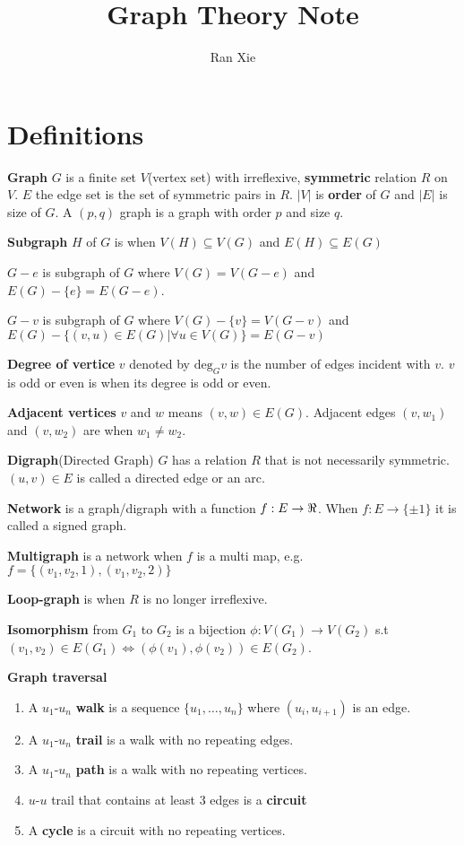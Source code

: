 \documentclass[12pt]{article}
\title{Graph Theory Note}
\author{Ran Xie}
\begin{document}
\maketitle
\section{Definitions}
\textbf{Graph} $G$ is a finite set $V$(vertex set) with irreflexive, \textbf{symmetric} relation $R$ on $V$. $E$ the edge set is the set of symmetric pairs in $R$.  $|V|$ is \textbf{order} of $G$ and $|E|$ is size of $G$. A $(p, q)$ graph is a graph with order $p$ and size $q$.

\textbf{Subgraph} $H$ of $G$ is when $V(H) \subseteq V(G)$ and $E(H) \subseteq  E(G)$

\textbf{$G - e$} is subgraph of $G$ where $V(G) = V(G -e)$ and $E(G) - \{e\} = E(G-e)$.

\textbf{$G - v$} is subgraph of $G$ where $V(G) - \{v\} = V(G - v)$ and $E(G) - \{(v, u) \in E(G) | \forall u \in V(G) \} = E(G - v)$

\textbf{Degree of vertice} $v$ denoted by $\text{deg}_G v$ is the number of edges incident with $v$. $v$ is odd or even is when its degree is odd or even.

\textbf{Adjacent vertices} $v$ and $w$ means $(v,w)\in E(G)$. Adjacent edges $(v, w_1)$ and $(v, w_2)$ are when $w_1 \neq w_2$.

\textbf{Digraph}(Directed Graph) $G$ has a relation $R$ that is not necessarily symmetric. $(u,v) \in E$ is called a directed edge or an arc.

\textbf{Network} is a graph/digraph with a function $f: E \rightarrow \real$. When $f : E \rightarrow \{\pm 1\}$ it is called a signed graph. 

\textbf{Multigraph} is a network when $f$ is a multi map, e.g. $f=\{(v_1, v_2, 1), (v_1, v_2, 2)\}$

\textbf{Loop-graph} is when $R$ is no longer irreflexive.

\textbf{Isomorphism } from $G_1$ to $G_2$ is a bijection $\phi: V(G_1) \rightarrow V(G_2)$ s.t $(v_1, v_2) \in E(G_1) \iff (\phi(v_1), \phi(v_2))\in E(G_2)$.

\textbf {Graph traversal} \begin{enumerate}
	\item A $u_1$-$u_n$ \textbf{walk} is a sequence $\{u_1, \ldots, u_n\}$ where $(u_i, u_{i+1})$ is an edge.
	\item  A $u_1$-$u_n$ \textbf{trail} is a walk with no repeating edges.
	\item A $u_1$-$u_n$ \textbf{path} is a walk with no repeating vertices.
	\item $u$-$u$ trail that contains at least 3 edges is a \textbf{circuit}
	\item A \textbf{cycle} is a circuit with no repeating vertices. 
\end{enumerate} 
\end{document}
